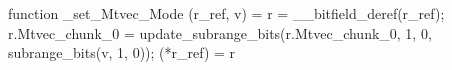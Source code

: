function _set_Mtvec_Mode (r_ref, v) = {
    r = __bitfield_deref(r_ref);
    r.Mtvec_chunk_0 = update_subrange_bits(r.Mtvec_chunk_0, 1, 0, subrange_bits(v, 1, 0));
    (*r_ref) = r
}
